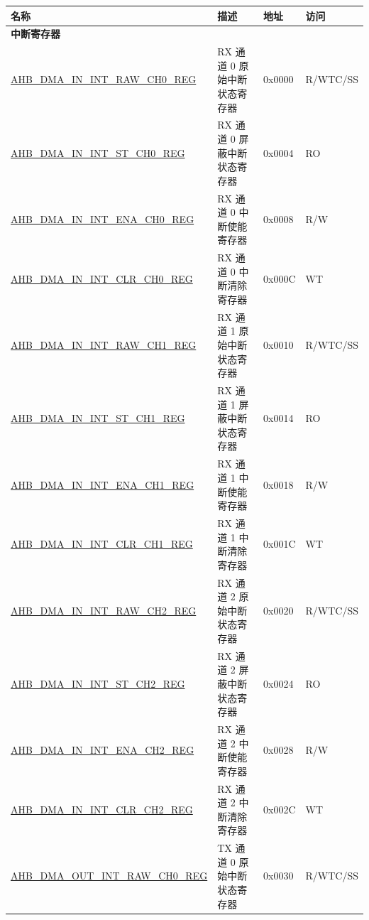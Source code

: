 \newif\ifahbdmalateststatus
\iftagged{ESP32-P4-latest}{\ahbdmalateststatustrue}{\ahbdmalateststatusfalse}
\begin{longtable}{ | l | l | p{1.3cm} | l | }
\hline\rowcolor{lightgray}
\textbf{名称} & \textbf{描述} & \textbf{地址} & \textbf{访问} \\ \hline
\endhead
\multicolumn{4}{|l|}{\textbf{中断寄存器}} \\ \hline
\hyperref[regdesc:AHBDMAININTRAWCHNREG]{AHB\_DMA\_IN\_INT\_RAW\_CH0\_REG} & RX 通道 0 原始中断状态寄存器 & 0x0000 & R/WTC/SS \\ \hline
\hyperref[regdesc:AHBDMAININTSTCHNREG]{AHB\_DMA\_IN\_INT\_ST\_CH0\_REG} & RX 通道 0 屏蔽中断状态寄存器 & 0x0004 & RO \\ \hline
\hyperref[regdesc:AHBDMAININTENACHNREG]{AHB\_DMA\_IN\_INT\_ENA\_CH0\_REG} & RX 通道 0 中断使能寄存器 & 0x0008 & R/W \\ \hline
\hyperref[regdesc:AHBDMAININTCLRCHNREG]{AHB\_DMA\_IN\_INT\_CLR\_CH0\_REG} & RX 通道 0 中断清除寄存器 & 0x000C & WT \\ \hline
\hyperref[regdesc:AHBDMAININTRAWCHNREG]{AHB\_DMA\_IN\_INT\_RAW\_CH1\_REG} & RX 通道 1 原始中断状态寄存器 & 0x0010 & R/WTC/SS \\ \hline
\hyperref[regdesc:AHBDMAININTSTCHNREG]{AHB\_DMA\_IN\_INT\_ST\_CH1\_REG} & RX 通道 1 屏蔽中断状态寄存器 & 0x0014 & RO \\ \hline
\hyperref[regdesc:AHBDMAININTENACHNREG]{AHB\_DMA\_IN\_INT\_ENA\_CH1\_REG} & RX 通道 1 中断使能寄存器 & 0x0018 & R/W \\ \hline
\hyperref[regdesc:AHBDMAININTCLRCHNREG]{AHB\_DMA\_IN\_INT\_CLR\_CH1\_REG} & RX 通道 1 中断清除寄存器 & 0x001C & WT \\ \hline
\hyperref[regdesc:AHBDMAININTRAWCHNREG]{AHB\_DMA\_IN\_INT\_RAW\_CH2\_REG} & RX 通道 2 原始中断状态寄存器 & 0x0020 & R/WTC/SS \\ \hline
\hyperref[regdesc:AHBDMAININTSTCHNREG]{AHB\_DMA\_IN\_INT\_ST\_CH2\_REG} & RX 通道 2 屏蔽中断状态寄存器 & 0x0024 & RO \\ \hline
\hyperref[regdesc:AHBDMAININTENACHNREG]{AHB\_DMA\_IN\_INT\_ENA\_CH2\_REG} & RX 通道 2 中断使能寄存器 & 0x0028 & R/W \\ \hline
\hyperref[regdesc:AHBDMAININTCLRCHNREG]{AHB\_DMA\_IN\_INT\_CLR\_CH2\_REG} & RX 通道 2 中断清除寄存器 & 0x002C & WT \\ \hline
\hyperref[regdesc:AHBDMAOUTINTRAWCHNREG]{AHB\_DMA\_OUT\_INT\_RAW\_CH0\_REG} & TX 通道 0 原始中断状态寄存器 & 0x0030 & R/WTC/SS \\ \hline

\end{longtable}
